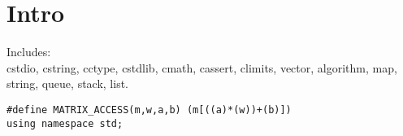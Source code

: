 \section{Intro}

Includes: \\
cstdio, cstring, cctype, cstdlib, cmath, cassert, climits, vector, algorithm, map, string, queue, stack, list.

\begin{verbatim}
#define MATRIX_ACCESS(m,w,a,b) (m[((a)*(w))+(b)])
using namespace std;
\end{verbatim}

